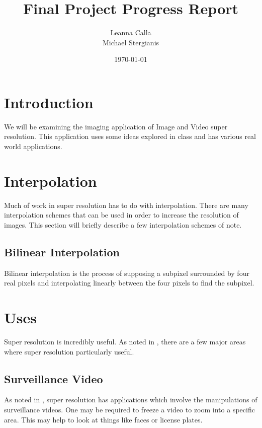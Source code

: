 \documentclass{article}
\title{Final Project Progress Report}
\author{Leanna Calla\\Michael Stergianis}
\date{\today}
\begin{document}
\maketitle

\section{Introduction}
We will be examining the imaging application of Image and Video super
resolution. This application uses some ideas explored
in class and has various real world applications. 
\section{Interpolation}
\label{sec:interpolation}
Much of work in super resolution has to do with interpolation.  There
are many interpolation schemes that can be used in order to increase
the resolution of images. This section will briefly describe a few
interpolation schemes of note.
%
\subsection{Bilinear Interpolation}
\label{subsec:bilinear}
Bilinear interpolation is the process of supposing a subpixel
surrounded by four real pixels and interpolating linearly between the
four pixels to find the subpixel.
%
%
\section{Uses}
\label{sec:uses}

Super resolution is incredibly useful. As noted in
\cite{Yang2010ImageSH}, there are a few major areas where super
resolution particularly useful.
\subsection{Surveillance Video}
As noted in \cite{Yang2010ImageSH}, super resolution has applications
which involve the manipulations of surveillance videos. One may be
required to freeze a video
to zoom into a specific area. This may help to look at things like faces or license plates.
\end{document}
